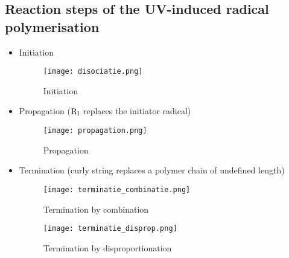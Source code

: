 \subsection{Reaction steps of the UV-induced radical polymerisation}

    \begin{itemize}
        \item Initiation
                \begin{figure}[H]
                    \centering
                \texttt{[image: disociatie.png]}
                \caption{Initiation}
            \end{figure}
        \item Propagation ($\mathtext[I]{R}$ replaces the initiator radical)
            \begin{figure}[H]
                \centering
                \texttt{[image: propagation.png]}
                \caption{Propagation}
            \end{figure}
        \item Termination (curly string replaces a polymer chain of undefined length)
            \begin{figure}[H]
                \centering
                \texttt{[image: terminatie\_combinatie.png]}
                \caption{Termination by combination}
            \end{figure}
            \begin{figure}[H]
                \centering
                \texttt{[image: terminatie\_disprop.png]}
                \caption{Termination by disproportionation}
            \end{figure}
    \end{itemize}